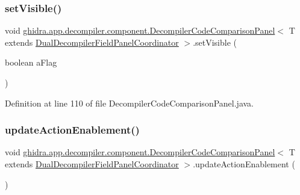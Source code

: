 \subsubsection{\texorpdfstring{setVisible()}{setVisible()}}
{\footnotesize\ttfamily void \mbox{\hyperlink{classghidra_1_1app_1_1decompiler_1_1component_1_1_decompiler_code_comparison_panel}{ghidra.\+app.\+decompiler.\+component.\+Decompiler\+Code\+Comparison\+Panel}}$<$ T extends \mbox{\hyperlink{classghidra_1_1app_1_1decompiler_1_1component_1_1_dual_decompiler_field_panel_coordinator}{Dual\+Decompiler\+Field\+Panel\+Coordinator}} $>$.set\+Visible (\begin{DoxyParamCaption}\item[{boolean}]{a\+Flag }\end{DoxyParamCaption})\hspace{0.3cm}{\ttfamily [inline]}}



Definition at line 110 of file Decompiler\+Code\+Comparison\+Panel.\+java.

\mbox{\label{classghidra_1_1app_1_1decompiler_1_1component_1_1_decompiler_code_comparison_panel_a44ed95456890b14be5453662e784f7ca}} 
\subsubsection{\texorpdfstring{updateActionEnablement()}{updateActionEnablement()}}
{\footnotesize\ttfamily void \mbox{\hyperlink{classghidra_1_1app_1_1decompiler_1_1component_1_1_decompiler_code_comparison_panel}{ghidra.\+app.\+decompiler.\+component.\+Decompiler\+Code\+Comparison\+Panel}}$<$ T extends \mbox{\hyperlink{classghidra_1_1app_1_1decompiler_1_1component_1_1_dual_decompiler_field_panel_coordinator}{Dual\+Decompiler\+Field\+Panel\+Coordinator}} $>$.update\+Action\+Enablement (\begin{DoxyParamCaption}{ }\end{DoxyParamCaption})\hspace{0.3cm}{\ttfamily [inline]}}



